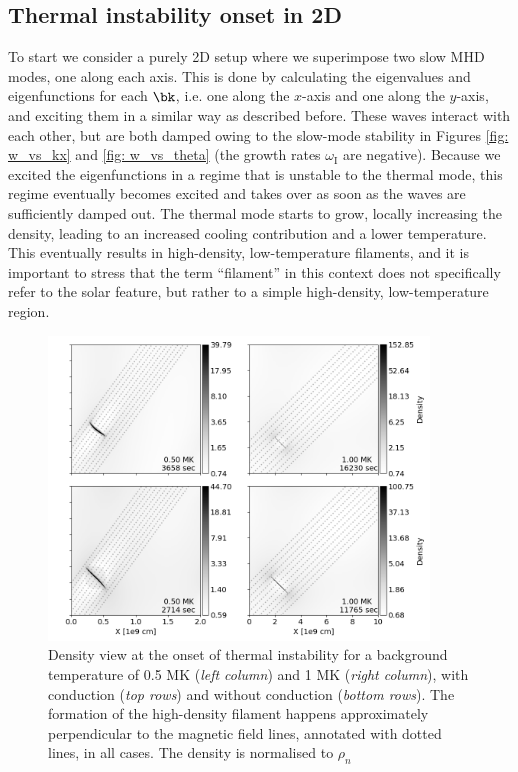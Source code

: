 \subsection{Thermal instability onset in 2D}
To start we consider a purely 2D setup where we superimpose two slow MHD modes, one along each axis. This is done by calculating the eigenvalues and eigenfunctions for each $\bk$, i.e. one along the $x$-axis and one along the $y$-axis, and exciting them in a similar way as described before. These waves interact with each other, but are both damped owing to the slow-mode stability in Figures \ref{fig: w_vs_kx} and \ref{fig: w_vs_theta} (the growth rates $\omega_\text{I}$ are negative). Because we excited the eigenfunctions in a regime that is unstable to the thermal mode, this regime eventually becomes excited and takes over as soon as the waves are sufficiently damped out. The thermal mode starts to grow, locally increasing the density, leading to an increased cooling contribution and a lower temperature. This eventually results in high-density, low-temperature filaments, and it is important to stress that the term ``filament'' in this context does not specifically refer to the solar feature, but rather to a simple high-density, low-temperature region.

\begin{figure}[t]
  \centering
  \includegraphics[width=0.9\textwidth]{2d_instability_onsets.png}
  \caption{
    Density view at the onset of thermal instability for a background temperature of 0.5 MK (\emph{left column}) and
    1 MK (\emph{right column}), with conduction (\emph{top rows}) and without conduction (\emph{bottom rows}). The formation of the high-density filament happens approximately perpendicular to the magnetic field lines, annotated with dotted lines, in all cases. The density is normalised to $\rho_n$
  }
  \label{fig: 2d_instability_onsets}
\end{figure}


